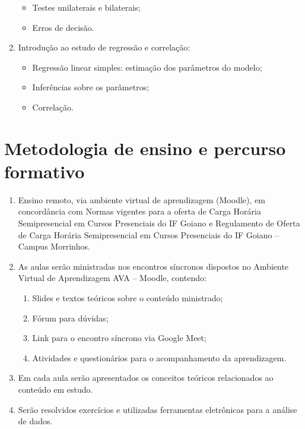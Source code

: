 \documentclass[
]{book}
\providecommand{\tightlist}{%
  \setlength{\itemsep}{0pt}\setlength{\parskip}{0pt}}
\begin{document}
\begin{enumerate}
  \begin{itemize}
  \tightlist
  \item
    Testes unilaterais e bilaterais;
  \item
    Erros de decisão.
  \end{itemize}
\item
  Introdução ao estudo de regressão e correlação:

  \begin{itemize}
  \tightlist
  \item
    Regressão linear simples: estimação dos parâmetros do modelo;
  \item
    Inferências sobre os parâmetros;
  \item
    Correlação.
  \end{itemize}
\end{enumerate}

\hypertarget{metodologia-de-ensino-e-percurso-formativo}{%
\section{Metodologia de ensino e percurso formativo}\label{metodologia-de-ensino-e-percurso-formativo}}

\begin{enumerate}
\def\labelenumi{\arabic{enumi}.}
\item
  Ensino remoto, via ambiente virtual de aprendizagem (Moodle), em concordância com Normas vigentes para a oferta de Carga Horária Semipresencial em Cursos Presenciais do IF Goiano e Regulamento de Oferta de Carga Horária Semipresencial em Cursos Presenciais do IF Goiano -- Campus Morrinhos.
\item
  As aulas serão ministradas nos encontros síncronos dispostos no Ambiente Virtual de Aprendizagem AVA -- Moodle, contendo:

  \begin{enumerate}
  \def\labelenumii{\alph{enumii})}
  \tightlist
  \item
    Slides e textos teóricos sobre o conteúdo ministrado;
  \item
    Fórum para dúvidas;
  \item
    Link para o encontro síncrono via Google Meet;
  \item
    Atividades e questionários para o acompanhamento da aprendizagem.
  \end{enumerate}
\item
  Em cada aula serão apresentados os conceitos teóricos relacionados ao conteúdo em estudo.
\item
  Serão resolvidos exercícios e utilizadas ferramentas eletrônicas para a análise de dados.
\end{enumerate}
\end{document}
